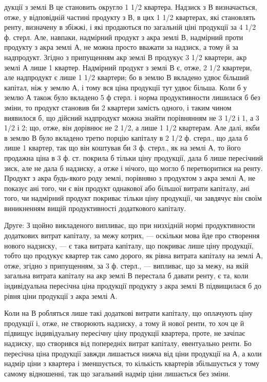 \parcont{}  %
дукції з землі В це становить округло 1 1/2 квартера. Надзиск з В визначається,
отже, у відповідній частині продукту з В, в цих 1 1/2 квартерах, які
становлять ренту, визначену в збіжжі, і які продаються по загальній ціні продукції
за 4  1/2 ф. стерл. Але, навпаки, надмірний продукт з акра землі В, надмірний
проти продукту з акра землі А, не можна просто вважати за надзиск,
а тому й за надпродукт. Згідно з припущенням акр землі В продукує 3  1/2 квартери,
акр землі А лише 1 квартер. Надмірний продукт з землі В є, отже,
2 1/2 квартери, але надпродукт є лише 1 1/2 квартери; бо в землю В вкладено
удвоє більший капітал, ніж у землю А, і тому вся ціна продукції тут удвоє
більша. Коли б у землю А також було вкладено 5 ф стерл. і норма продуктивности
лишилася б без зміни, то продукт становив би 2 квартери замість одного,
і таким чином виявилося б, що дійсний надпродукт можна знайти порівнянням
не 3  1/2 і 1, а 3  1/2 і 2; що, отже, він дорівнює не 2  1/2, а лише 1  1/2 квартерам.
Але далі, якби в землю В було вкладено третю порцію капіталу в 2  1/2 ф. стерл.,
що дала б лише 1 квартер, так що він коштував би 3 ф. стерл., як на землі А, то
його продажна ціна в 3 ф. ст. покрила б тільки ціну продукції, дала б лише
пересічний зиск, але не дала б надзиску, а отже і нічого, що могло б перетворитися
на ренту. Продукт з акра будь-якого роду землі, порівняно з продуктом
з акра землі А, не показує ані того, чи є він продукт однакової або більшої
витрати капіталу, ані того, чи надмірний продукт покриває тільки ціну продукції,
чи завдячує він своїм виникненням вищій продуктивності додаткового капіталу.

Друге: З щойно викладеного випливає, що при низхідній нормі продуктивности
додаткових витрат капіталу, за межу котрих, — оскільки мова йде
про створення нового надзиску, — є така витрата капіталу, що покриває лише
ціну продукції, тобто що продукує квартер так само дорого, як рівна витрата
капіталу на землі А, отже, згідно з припущенням, за 3 ф. стерл., — випливає,
що за межу, на якій загальна витрата капіталу на акр землі В перестала б
давати ренту, є та, коли індивідуальна пересічна ціна продукції продукту з
акра землі В підвищилася б до рівня ціни продукції з акра землі А.

Коли на В робляться лише такі додаткові витрати капіталу, що оплачують
ціну продукції і, отже, не створюють надзиску, а тому й нової ренти, то хоч
це й підвищує індивідуальну пересічну ціну продукції квартера, проте, не зачіпає
надзиску, що створився від попередніх витрат капіталу, евентуально ренти. Бо
пересічна ціна продукції завжди лишається нижча від ціни продукції на А, а коли
надмір ціни з квартера і зменшується, то кількість квартерів збільшується
у тому самому відношенні, так що загальний надмір ціни лишається без зміни.

